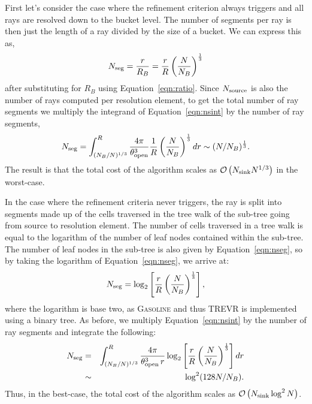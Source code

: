 \documentclass[fleq,usenatbib]{mnras}
\newcommand{\acro}{TREVR}
\newcommand{\bigO}[1]{\mathcal{O}\left(#1\right)}
\newcommand{\NS}{N_{\rm source}}
\newcommand{\NK}{N_{\rm sink}}
\newcommand{\tO}{\theta_{\rm open}}
\begin{document}
{First let's consider the case where the refinement criterion always triggers 
and all rays are resolved down to the bucket level. The number of segments per 
ray is then just the length of a ray divided by the size of a bucket. We can 
express this as,
\begin{equation}
\label{eqn:nseg}
N_{\rm seg} = \frac{r}{R_B} = \frac{r}{R}\left(\frac{N}{N_B}\right)^\frac{1}{3}
\end{equation}
after substituting for $R_B$ using Equation~\ref{eqn:ratio}. Since $\NS$ is 
also the number of rays computed per resolution element, to get the total number of ray segments we
multiply the integrand of Equation~\ref{eqn:nsint} by the number of ray 
segments,
\begin{equation}
\label{eqn:nsegint}
N_{\rm seg} = \int_{(N_B/N)^{1/3}}^R 
\frac{4\pi}{\tO^3}
\frac{1}{R}\left(\frac{N}{N_B}\right)^\frac{1}{3} dr
\sim (N/N_B)^\frac{1}{3}.
\end{equation}
The result is that the total cost of the algorithm scales as
$\bigO{\NK N^{1/3}}$ in the worst-case.

In the case where the refinement criteria never triggers, the ray is split into 
segments made up of the cells traversed in the tree walk of the sub-tree going 
from source to resolution element. The number of cells traversed in a tree walk
is equal to the logarithm of the number of leaf nodes contained within the 
sub-tree. The number of leaf nodes in the sub-tree is also given by 
Equation~\ref{eqn:nseg}, so by taking the logarithm of 
Equation~\ref{eqn:nseg}, we arrive at:
\begin{equation}
\label{eqn:nseg2}
N_{\rm seg} = \log_2\left[\frac{r}{R}\left(
\frac{N}{N_B}\right)^\frac{1}{3}\right],
\end{equation}
where the logarithm is base two, as \textsc{Gasoline} and thus \acro{} is 
implemented using a binary tree. As before, we multiply 
Equation~\ref{eqn:nsint} by the number of ray segments and integrate the 
following:
\begin{eqnarray}
\label{eqn:nsegint2}
N_{\rm seg} & = & \int_{(N_B/N)^{1/3}}^R 
\frac{4\pi}{\tO^3\, r}
\log_2\left[\frac{r}{R}\left(
\frac{N}{N_B}\right)^\frac{1}{3}\right] dr \nonumber\\
& \sim & \log^2(128 N/N_B).
\end{eqnarray}
Thus, in the best-case, the total cost of the algorithm scales as  
$\bigO{\NK \log^2N}$.

}
\end{document}
